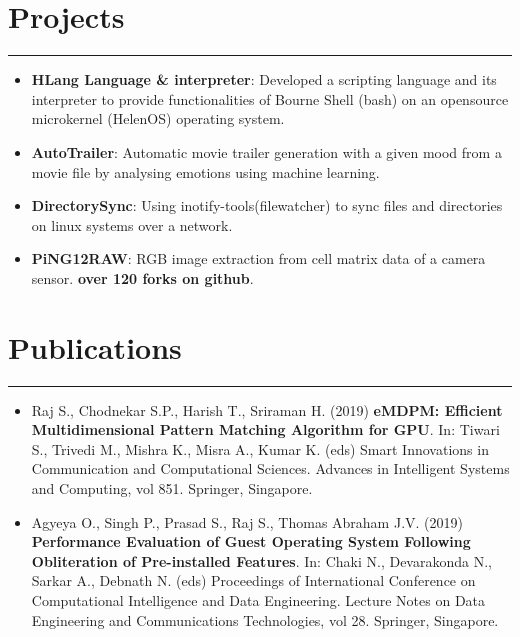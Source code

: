\documentclass[a4paper,6pt]{article}
\begin{document}
\section*{Projects}
\vspace{-8px}
\hrule
\vspace{4px}
\hspace{5px}
\begin{itemize}
    \item \textbf{HLang Language \& interpreter}: \small Developed a scripting language and its interpreter to provide functionalities of Bourne Shell (bash) on an opensource microkernel (HelenOS) operating system.
\normalsize
\vspace{2px}
	\item \textbf{AutoTrailer}: \small Automatic movie trailer generation with a given mood from a movie file by analysing emotions using machine learning. 
\vspace{2px}
\normalsize
	\item \textbf{DirectorySync}: \small Using inotify-tools(filewatcher) to sync files and directories on linux systems over a network.
\vspace{2px}
\normalsize
	\item \textbf{PiNG12RAW}: \small RGB image extraction from cell matrix data of a camera sensor. \textcolor{mygray}{\textbf{over 120 forks on github}}. 
\normalsize
\end{itemize}

\vspace{-9px}
\section*{Publications}
\vspace{-8px}
\hrule
\vspace{8px}
\begin{itemize}
	\item \small Raj S., Chodnekar S.P., Harish T., Sriraman H. (2019) \textcolor{mygray}{\textbf{eMDPM: Efficient Multidimensional Pattern Matching Algorithm for GPU}}. In: Tiwari S., Trivedi M., Mishra K., Misra A., Kumar K. (eds) Smart Innovations in Communication and Computational Sciences. Advances in Intelligent Systems and Computing, vol 851. Springer, Singapore. 
\normalsize
\vspace{2px}
	\item \small Agyeya O., Singh P., Prasad S., Raj S., Thomas Abraham J.V. (2019) \textcolor{mygray}{\textbf{Performance Evaluation of Guest Operating System Following Obliteration of Pre-installed Features}}. In: Chaki N., Devarakonda N., Sarkar A., Debnath N. (eds) Proceedings of International Conference on Computational Intelligence and Data Engineering. Lecture Notes on Data Engineering and Communications Technologies, vol 28. Springer, Singapore.
\normalsize
\end{itemize}
\end{document}
